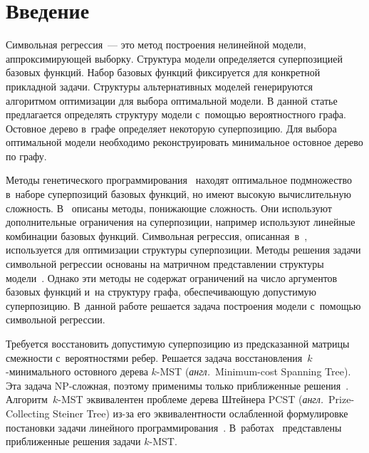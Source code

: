 \begin{multicols}{2}

\label{st\stat}

\section{Введение}

Символьная регрессия~--- это метод по\-стро\-ения нелинейной модели, 
аппроксимирующей выборку. Структура модели определяется суперпозицией базовых 
функций. Набор базовых функций фиксируется для конкретной прикладной задачи. 
Структуры альтернативных моделей генерируются алгоритмом оптимизации для выбора 
оптимальной модели. В данной статье предлагается определять структуру модели 
с~по\-мощью вероятностного графа. Остовное дерево в~графе определяет некоторую 
суперпозицию. Для выбора оптимальной модели необходимо реконструировать 
минимальное остовное дерево по графу.

Методы генетического программирования~\cite{koza1992genetic} находят оптимальное 
подмножество в~наборе суперпозиций базовых функций, но имеют высокую 
вычислительную сложность. В~\cite{searson2010gptips} описаны методы, понижающие 
сложность. Они используют дополнительные ограничения на суперпозиции, например 
используют линейные комбинации базовых функций. Символьная регрессия, 
описанная~в~\cite{stanley2002evolving}, используется для оптимизации структуры 
суперпозиции. Методы решения задачи символьной регрессии основаны на матричном 
представлении структуры модели~\cite{bochkarev2017generation}. Однако эти методы 
не содержат ограничений на чис\-ло аргументов базовых функций и~на структуру 
графа, обеспечивающую допустимую суперпозицию. В~данной работе решается задача 
построения модели с~помощью символьной регрессии.

Требуется восстановить допустимую суперпозицию из предсказанной мат\-ри\-цы 
смежности с~вероятностями ребер. Решается задача вос\-ста\-нов\-ле\-ния~$k$-минимального 
остовного дерева $k$-MST (\textit{англ.}\ Minimum-cost Spanning Tree). Эта задача NP-слож\-ная, 
поэтому применимы только при\-бли\-жен\-ные решения~\cite{ravi1996spanning}. 
Алгоритм~$k$-MST эквивалентен проб\-ле\-ме дерева Штейнера PCST (\textit{англ.}\ 
Prize-Collecting Steiner Tree) из-за его эквивалентности ослабленной формулировке 
постановки задачи линейного программирования~\cite{chudak2004approximate}. 
В~работах~\cite{ravi1996spanning,awerbuch1998new,arora20062+} пред\-став\-ле\-ны 
приближенные решения задачи \mbox{$k$-MST}.




\end{multicols}
